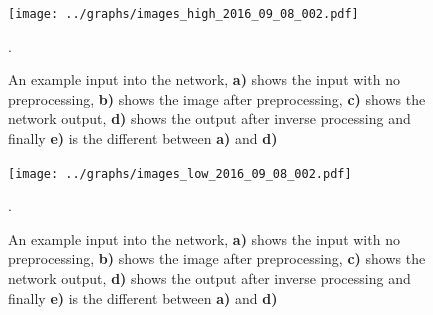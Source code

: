       \begin{table}[!h] 
      \end{table}

        \begin{figure}[!h]
        \centering
        \texttt{[image: ../graphs/images\_high\_2016\_09\_08\_002.pdf]}
        \caption{An example input into the network, {\bf a)} shows the input with no preprocessing,
        {\bf b)} shows the image after preprocessing, {\bf c)} shows the network output, {\bf d)} shows the output after inverse processing
        and finally {\bf e)} is the different between {\bf a)} and {\bf d)}}. \label{fig:recon1}
        \end{figure}

        \begin{table}[!h] 
         \end{table}

        \begin{figure}[!h]
        \centering
        \texttt{[image: ../graphs/images\_low\_2016\_09\_08\_002.pdf]}
        \caption{An example input into the network, {\bf a)} shows the input with no preprocessing,
        {\bf b)} shows the image after preprocessing, {\bf c)} shows the network output, {\bf d)} shows the output after inverse processing
        and finally {\bf e)} is the different between {\bf a)} and {\bf d)}}. \label{fig:recon2}
        \end{figure}

